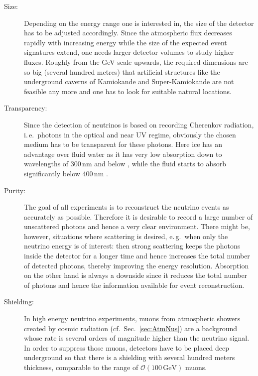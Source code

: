 \begin{description}
 \item[Size:] Depending on the energy range one is interested in, the size of
  the detector has to be adjusted accordingly. Since the atmospheric flux
  decreases rapidly with increasing energy while the size of the expected
  event signatures extend, one needs larger detector volumes  to study
  higher fluxes. Roughly from the GeV scale upwards, the required dimensions are
  so big (several hundred metres) that artificial structures like the
  underground caverns of Kamiokande and Super-Kamiokande \cite{SuperKosc} are
  not feasible any more and one has to look for suitable natural locations.
 \item[Transparency:] Since the detection of neutrinos is based on recording
  Cherenkov radiation, i.\,e.\ photons in the optical and near UV regime,
  obviously the chosen medium has to be transparent for these photons. Here ice
  has an advantage over fluid water as it has very low absorption down to
  wavelengths of 300\,nm and below \cite{IceProps}, while the fluid starts to
  absorb significantly below 400\,nm \cite{WaterAbs}.
 \item[Purity:] The goal of all experiments is to reconstruct the neutrino
  events
  as accurately as possible. Therefore it is desirable to record a large number
  of unscattered photons and hence a very clear environment. There might
  be, however, situations where scattering is desired, e.\,g.\ when only the
  neutrino energy is of interest: then strong scattering keeps the photons
  inside the detector for a longer time and hence increases the total number
  of detected photons, thereby improving the energy resolution. Absorption on
  the other hand is always a downside since it reduces the total number of
  photons and hence the information available for event reconstruction.
 \item[Shielding:] In high energy neutrino experiments, muons from atmospheric
  showers created by cosmic radiation (cf.\ Sec.~\ref{sec:AtmNus}) are a
  background whose rate is several orders of magnitude higher than the
  neutrino signal. In order to suppress those muons, detectors have to be
  placed deep underground so that there is a shielding with several hundred
  meters thickness, comparable to the range of $\mathcal{O}
  (100\,\mathrm{GeV})$ muons.
\end{description}

